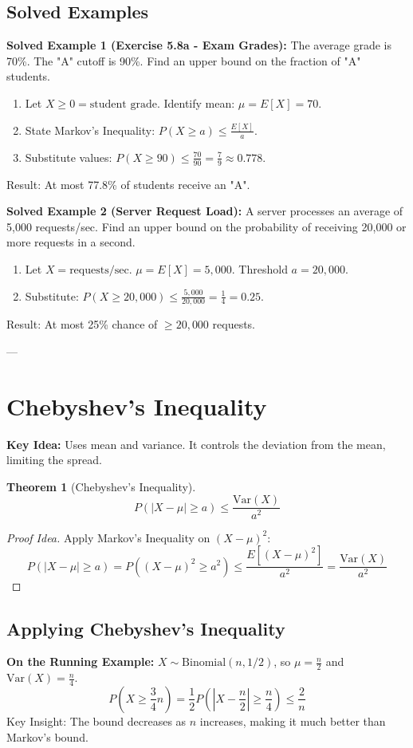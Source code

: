 \documentclass[11pt]{article}
\newtheorem{theorem}{Theorem}
\begin{document}
\subsection{Solved Examples}
\textbf{Solved Example 1 (Exercise 5.8a - Exam Grades):}
The average grade is 70\%. The "A" cutoff is 90\%. Find an upper bound on the fraction of "A" students.
\begin{enumerate}
    \item Let $X \ge 0 = \text{student grade}$. Identify mean: $\mu = E[X] = 70$.
    \item State Markov's Inequality: $P(X \ge a) \le \frac{E[X]}{a}$.
    \item Substitute values: $P(X \ge 90) \le \frac{70}{90} = \frac{7}{9} \approx 0.778$.
\end{enumerate}
Result: At most 77.8\% of students receive an "A".

\textbf{Solved Example 2 (Server Request Load):}
A server processes an average of 5,000 requests/sec. Find an upper bound on the probability of receiving 20,000 or more requests in a second.
\begin{enumerate}
    \item Let $X = \text{requests/sec}$. $\mu = E[X] = 5,000$. Threshold $a = 20,000$.
    \item Substitute: $P(X \ge 20,000) \le \frac{5,000}{20,000} = \frac{1}{4} = 0.25$.
\end{enumerate}
Result: At most 25\% chance of $\ge 20,000$ requests.

---

\section{Chebyshev's Inequality}

\textbf{Key Idea:} Uses mean and variance. It controls the deviation from the mean, limiting the spread.

\begin{theorem}[Chebyshev's Inequality]
\[ P(|X - \mu| \ge a) \le \frac{\text{Var}(X)}{a^2} \]
\end{theorem}

\begin{proof}[Proof Idea]
Apply Markov's Inequality on $(X - \mu)^2$:
\[ P(|X - \mu| \ge a) = P((X - \mu)^2 \ge a^2) \le \frac{E[(X - \mu)^2]}{a^2} = \frac{\text{Var}(X)}{a^2} \]
\end{proof}

\subsection{Applying Chebyshev's Inequality}
\textbf{On the Running Example:} 
$X \sim \text{Binomial}(n, 1/2)$, so $\mu = \frac{n}{2}$ and $\text{Var}(X) = \frac{n}{4}$.
\[ P\left(X \ge \frac{3}{4}n\right) = \frac{1}{2}P\left(\left|X - \frac{n}{2}\right| \ge \frac{n}{4}\right) \le \frac{2}{n} \]
Key Insight: The bound decreases as $n$ increases, making it much better than Markov's bound.
\end{document}
